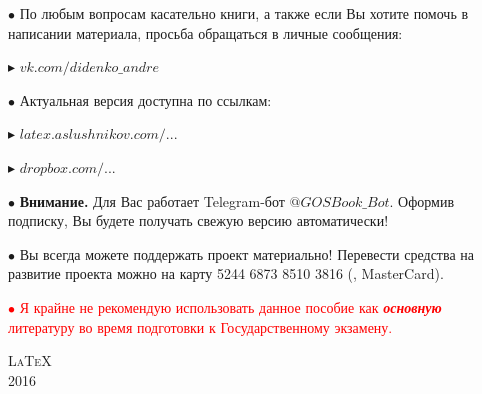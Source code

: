 \begin{flushleft}
	$\bullet$ По любым вопросам касательно книги, а также если Вы хотите помочь в написании материала, просьба обращаться в личные сообщения: 
	
	\vspace*{0.2\baselineskip}
	
	\qquad\textcolor{Purplemountainmajesty}{$\blacktriangleright$ }\href{https://vk.com/didenko_andre}{$vk.com/didenko\_andre$}
	
	\vfill
	
	$\bullet$ Актуальная версия доступна по ссылкам:
	
	\vspace*{0.2\baselineskip}
	
	\qquad\textcolor{Purplemountainmajesty}{$\blacktriangleright$ }\href{http://latex.aslushnikov.com/compile?git=https://github.com/DidenkoAndre/GOS_book&target=_main.tex}{\large \textcolor{Purplemountainmajesty}{$latex.aslushnikov.com/...$}}
	
	\vspace*{0.2\baselineskip}
	
	\qquad\textcolor{Purplemountainmajesty}{$\blacktriangleright$ }\href{https://www.dropbox.com/sh/7e5mfj8q68o2ipp/AAD8XvpZhiJzFbEh_IeH305ia?dl=0&preview=GOSBook.pdf}{\large \textcolor{Purplemountainmajesty}{$dropbox.com/...$}}
	
	\vfill
	
	$\bullet$ \textbf{Внимание.} Для Вас работает Telegram-бот \href{https://t.me/GOSBook_Bot}{\textcolor{PersianBlue}{$@GOSBook\_Bot$}}. Оформив подписку\footnotemark{}, Вы будете получать свежую версию автоматически!
	
	
	\vfill
	
	$\bullet$ Вы всегда можете поддержать проект материально! 
	Перевести средства на развитие проекта можно на карту {\large 5244 6873 8510 3816} \textsf{(\grqq, MasterCard)}.
	
	\bigskip
	\vfill
	
	\bigskip
	\vfill
	
	\textcolor{red}{
		$\bullet$ Я крайне не рекомендую использовать данное пособие как \textit{\textbf{основную}} литературу во время подготовки к Государственному экзамену.
	}
\end{flushleft}

\vfill
{\LARGE\scshape \LaTeX}\\[0.5\baselineskip]
{\LARGE\scshape 2016}\par
\restoregeometry
\endgroup